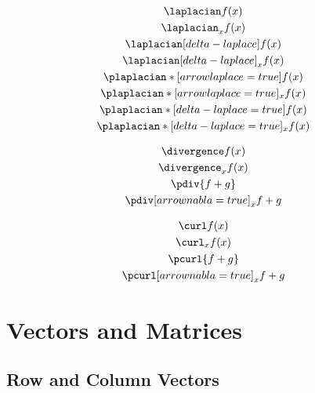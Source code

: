 \documentclass[parskip=half]{scrartcl}
\begin{document}
\begin{SideBySideExample}[xrightmargin=.3\textwidth,gobble=2]
  \begin{gather*}
    \laplacian f(x)\\
    \laplacian_{x} f(x)\\
    \laplacian[delta-laplace] f(x)\\
    \laplacian[delta-laplace]_{x} f(x)\\
    \plaplacian*[arrowlaplace=true]{f(x)}\\
    \plaplacian*[arrowlaplace=true]_{x}{f(x)}\\
    \plaplacian*[delta-laplace=true]{f(x)}\\
    \plaplacian*[delta-laplace=true]_{x}{f(x)}\\
  \end{gather*}
\end{SideBySideExample}

\fulllinerule

\begin{SideBySideExample}[xrightmargin=.3\textwidth,gobble=2]
  \begin{gather*}
    \divergence f(x) \\
    \divergence_{x} f(x) \\
    \pdiv{f+g}\\
    \pdiv[arrownabla=true]_{x}{f+g}\\
  \end{gather*}
\end{SideBySideExample}

\fulllinerule

\begin{SideBySideExample}[xrightmargin=.3\textwidth,gobble=2]
  \begin{gather*}
    \curl f(x)\\
    \curl_{x} f(x)\\
    \pcurl{f+g}\\
    \pcurl[arrownabla=true]_{x}{f+g}
  \end{gather*}
\end{SideBySideExample}

\fulllinerule

\section{Vectors and Matrices}

\subsection{Row and Column Vectors}
\end{document}
